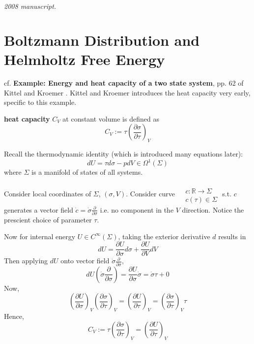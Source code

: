 \noindent\textit{2008 manuscript.}

\section{Boltzmann Distribution and Helmholtz Free Energy}

cf. \textbf{Example: Energy and heat capacity of a two state system}, pp. 62 of Kittel and Kroemer \cite{CKittelHKroemer1980}.  Kittel and Kroemer introduces the heat capacity very early, specific to this example.  

\begin{definition}
\textbf{heat capacity} $C_V$ at constant volume is defined as 
\begin{equation}
  C_V := \tau \left( \frac{ \partial \sigma }{ \partial \tau} \right)_V
\end{equation}
\end{definition}

Recall the thermodynamic identity (which is introduced many equations later): 
\[
dU = \tau d\sigma - pdV \in \Omega^1(\Sigma)
\]
where $\Sigma$ is a manifold of states of all systems.

Consider local coordinates of $\Sigma$, $(\sigma,V)$.  Consider curve $\begin{aligned} & \quad \\ 
  & c : \mathbb{R} \to \Sigma \\
  & c(\tau) \in \Sigma \end{aligned}$ s.t. $c$ generates a vector field $\dot{c} = \dot{\sigma} \frac{ \partial }{ \partial \sigma}$ i.e. no component in the $V$ direction.  Notice the prescient choice of parameter $\tau$.  

Now for internal energy $U \in C^{\infty}(\Sigma)$, taking the exterior derivative $d$ results in 
\[
dU = \frac{ \partial U}{ \partial \sigma} d\sigma + \frac{ \partial U}{ \partial V} dV
\]
Then applying $dU$ onto vector field $\dot{\sigma}\frac{\partial}{\partial \sigma}$,
\[
dU\left(\dot{\sigma} \frac{\partial }{ \partial \sigma} \right) = \frac{ \partial U}{ \partial \sigma} \dot{\sigma} = \dot{\sigma} \tau + 0 
\]
Now,
\[
\left( \frac{ \partial U}{ \partial \sigma} \right)_V \left( \frac{ \partial \sigma }{ \partial \tau} \right)_V = \left( \frac{ \partial U}{ \partial \tau} \right)_V = \left( \frac{ \partial \sigma }{ \partial \tau} \right)_V \tau
\]
Hence, 
\begin{equation}
C_V := \tau \left( \frac{ \partial \sigma }{ \partial \tau } \right)_V = \left( \frac{ \partial U}{ \partial \tau} \right)_V
\end{equation}

